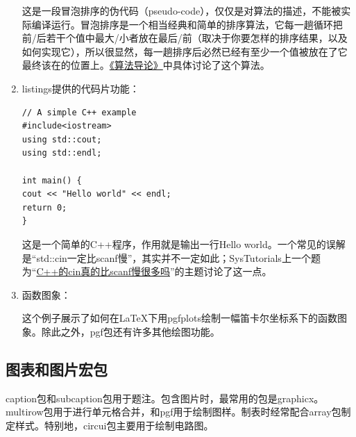 \begin{enumerate}
这是一段冒泡排序的伪代码（pseudo-code），仅仅是对算法的描述，不能被实际编译运行。冒泡排序是一个相当经典和简单的排序算法，它每一趟循环把前/后若干个值中最大/小者放在最后/前（取决于你要怎样的排序结果，以及如何实现它），所以很显然，每一趟排序后必然已经有至少一个值被放在了它最终该在的位置上。\href{https://book.douban.com/subject/3904676/}{《算法导论》}中具体讨论了这个算法。

\item listings提供的代码片功能：

\begin{lstlisting}[style = GNU_Cpp20_DevCpp]
// A simple C++ example
#include<iostream>
using std::cout;
using std::endl;

int main() {
cout << "Hello world" << endl;
return 0;
}
\end{lstlisting}

这是一个简单的C++程序，作用就是输出一行Hello world。一个常见的误解是“std::cin一定比scanf慢”，其实并不一定如此；SysTutorials上一个题为“\href{https://www.systutorials.com/is-cin-much-slower-than-scanf-in-c/}{C++的cin真的比scanf慢很多吗}”的主题讨论了这一点。

\item 函数图象：

\begin{figure}[H]
	\centering
\end{figure}

这个例子展示了如何在\LaTeX 下用pgfplots绘制一幅笛卡尔坐标系下的函数图象。除此之外，pgf包还有许多其他绘图功能。

\end{enumerate}

\renewcommand{\thefootnote}{\arabic{footnote}}

\subsection{图表和图片宏包}

caption包和subcaption包用于题注。包含图片时，最常用的包是graphicx。multirow包用于进行单元格合并，\TikZ 和pgf用于绘制图样。制表时经常配合array包制定样式。特别地，circui\TikZ 包主要用于绘制电路图。

